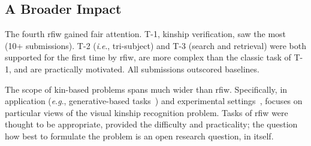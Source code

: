 \documentclass[letterpaper, 10 pt, conference]{ieeeconf}  %
\newcommand{\ie}{\textit{i}.\textit{e}., }
\newcommand{\eg}{\textit{e}.\textit{g}., }
\begin{document}
\subsection{A Broader Impact}


The fourth \ac{rfiw} gained fair attention. %
T-1, kinship verification, saw the most (10+ submissions). T-2 (\ie tri-subject) and T-3 (search and retrieval) were both supported for the first time by \ac{rfiw}, are more complex than the classic task of T-1, and are practically motivated. All submissions outscored baselines. 


The scope of kin-based problems spans much wider than \ac{rfiw}. Specifically, in application (\eg generative-based tasks~\cite{gao2019will, ozkan2018kinshipgan}) and experimental settings~\cite{mingaaai2020}, focuses on particular views of the visual kinship recognition problem. Tasks of \ac{rfiw} were thought to be appropriate, provided the difficulty and practicality; the question how best to formulate the problem is an open research question, in itself. 


\end{document}
